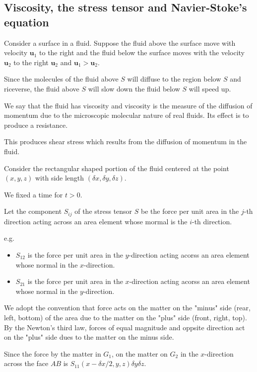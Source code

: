 \subsection{Viscosity, the stress tensor and Navier-Stoke's equation} %

Consider a surface in a fluid. Suppose the fluid above the surface move with velocity $\textbf{u}_1$ to the right and the fluid below the surface moves with the velocity $\textbf{u}_2$ to the right $\textbf{u}_2$ and $\textbf{u}_1 > \textbf{u}_2$.

Since the molecules of the fluid above $S$ will diffuse to the region below $S$ and riceverse, the fluid above $S$ will slow down the fluid below $S$ will speed up.

We say that the fluid has viscosity and viscosity is the measure of the diffusion of momentum due to the microscopic molecular nature of real fluids. Its effect is to produce a resistance.

This produces shear stress which results from the diffusion of momentum in the fluid.



Consider the rectangular shaped portion of the fluid centered at the point $(x,y,z)$ with side length $(\delta x, \delta y, \delta z)$.

We fixed a time for $t>0$.

Let the component $S_{ij}$ of the stress tensor $S$ be the force per unit area in the $j$-th direction acting across an area element whose mormal is the $i$-th direction.

e.g.

\begin{itemize}
	\item $S_{12}$ is the force per unit area in the $y$-direction acting acorss an area element whose normal in the $x$-direction.
	\item $S_{21}$ is the force per unit area in the $x$-direction acting acorss an area element whose normal in the $y$-direction.

\end{itemize}




We adopt the convention that force acts on the matter on the "minus" side (rear, left, bottom) of the area due to the matter on the "plus" side (front, right, top). By the Newton's third law, forces of equal magnitude and oppsite direction act on the "plus" side dues to the matter on the minus side.

Since the force by the matter in $G_{1}$, on the matter on $G_{2}$ in the $x$-direction across the face $AB$ is $S_{11}\left(x-\delta x/2, y,z\right)\delta y\delta z$.

